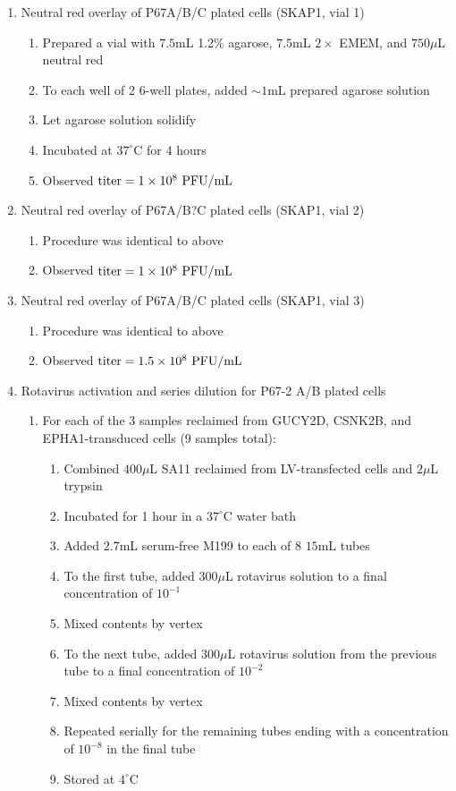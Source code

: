 \begin{enumerate}
	\item Neutral red overlay of P67A/B/C plated cells (SKAP1, vial 1)
		\begin{enumerate}
			\item Prepared a vial with $7.5$mL 1.2\% agarose, $7.5$mL $2\times$ EMEM, and $750\mu$L neutral red
			\item To each well of 2 6-well plates, added $\sim 1$mL prepared agarose solution
			\item Let agarose solution solidify
			\item Incubated at $37^{\circ}$C for 4 hours
			\item Observed $\text{titer}=1\times 10^{8}\text{ PFU/mL}$
		\end{enumerate}
	\item Neutral red overlay of P67A/B?C plated cells (SKAP1, vial 2)
		\begin{enumerate}
			\item Procedure was identical to above
			\item Observed $\text{titer}=1\times 10^{8}\text{ PFU/mL}$
		\end{enumerate}
	\item Neutral red overlay of P67A/B/C plated cells (SKAP1, vial 3)
		\begin{enumerate}
			\item Procedure was identical to above
			\item Observed $\text{titer}=1.5\times 10^{8}\text{ PFU/mL}$
		\end{enumerate}
	\item Rotavirus activation and series dilution for P67-2 A/B plated cells
		\begin{enumerate}
			\item For each of the 3 samples reclaimed from GUCY2D, CSNK2B, and EPHA1-transduced cells (9 samples total):
				\begin{enumerate}
					\item Combined $400\mu$L SA11 reclaimed from LV-transfected cells and $2\mu$L trypsin
					\item Incubated for 1 hour in a $37^{\circ}$C water bath
					\item Added $2.7$mL serum-free M199 to each of 8 $15$mL tubes
					\item To the first tube, added $300\mu$L rotavirus solution to a final concentration of $10^{-1}$
					\item Mixed contents by vertex
					\item To the next tube, added $300\mu$L rotavirus solution from the previous tube to a final concentration of $10^{-2}$
					\item Mixed contents by vertex
					\item Repeated serially for the remaining tubes ending with a concentration of $10^{-8}$ in the final tube
					\item Stored at $4^{\circ}$C
				\end{enumerate}
		\end{enumerate}
\end{enumerate}


